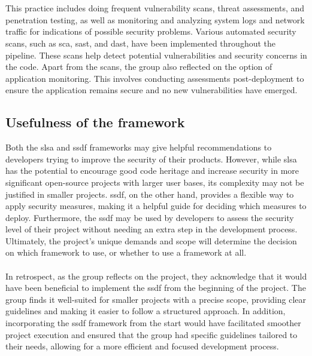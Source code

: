 \\~\\
This practice includes doing frequent vulnerability scans, threat assessments, and penetration testing, as well as monitoring and analyzing system logs and network traffic for indications of possible security problems. Various automated security scans, such as \acrshort{sca}, \acrshort{sast}, and \acrshort{dast}, have been implemented throughout the \gls{pipeline}. These scans help detect potential vulnerabilities and security concerns in the code. Apart from the scans, the group also reflected on the option of application monitoring. This involves conducting assessments post-deployment to ensure the application remains secure and no new vulnerabilities have emerged.

\subsection{Usefulness of the framework}

Both the \acrshort{slsa} and \acrshort{ssdf} frameworks may give helpful recommendations to developers trying to improve the security of their products. However, while \acrshort{slsa} has the potential to encourage good code heritage and increase security in more significant open-source projects with larger user bases, its complexity may not be justified in smaller projects. \acrshort{ssdf}, on the other hand, provides a flexible way to apply security measures, making it a helpful guide for deciding which measures to deploy. Furthermore, the \acrshort{ssdf} may be used by developers to assess the security level of their project without needing an extra step in the development process. Ultimately, the project's unique demands and scope will determine the decision on which framework to use, or whether to use a framework at all.
\\~\\
In retrospect, as the group reflects on the project, they acknowledge that it would have been beneficial to implement the \acrshort{ssdf} from the beginning of the project. The group finds it well-suited for smaller projects with a precise scope, providing clear guidelines and making it easier to follow a structured approach. In addition, incorporating the \acrshort{ssdf} framework from the start would have facilitated smoother project execution and ensured that the group had specific guidelines tailored to their needs, allowing for a more efficient and focused development process.

